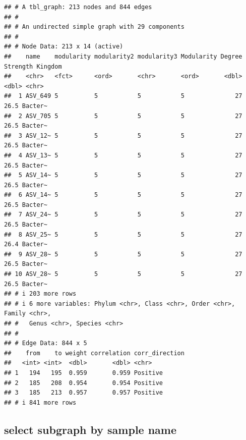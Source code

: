 \documentclass[
]{book}
\begin{document}
\begin{verbatim}
## # A tbl_graph: 213 nodes and 844 edges
## #
## # An undirected simple graph with 29 components
## #
## # Node Data: 213 x 14 (active)
##    name    modularity modularity2 modularity3 Modularity Degree Strength Kingdom
##    <chr>   <fct>      <ord>       <chr>       <ord>       <dbl>    <dbl> <chr>  
##  1 ASV_649 5          5           5           5              27     26.5 Bacter~
##  2 ASV_705 5          5           5           5              27     26.5 Bacter~
##  3 ASV_12~ 5          5           5           5              27     26.5 Bacter~
##  4 ASV_13~ 5          5           5           5              27     26.5 Bacter~
##  5 ASV_14~ 5          5           5           5              27     26.5 Bacter~
##  6 ASV_14~ 5          5           5           5              27     26.5 Bacter~
##  7 ASV_24~ 5          5           5           5              27     26.5 Bacter~
##  8 ASV_25~ 5          5           5           5              27     26.4 Bacter~
##  9 ASV_28~ 5          5           5           5              27     26.5 Bacter~
## 10 ASV_28~ 5          5           5           5              27     26.5 Bacter~
## # i 203 more rows
## # i 6 more variables: Phylum <chr>, Class <chr>, Order <chr>, Family <chr>,
## #   Genus <chr>, Species <chr>
## #
## # Edge Data: 844 x 5
##    from    to weight correlation corr_direction
##   <int> <int>  <dbl>       <dbl> <chr>         
## 1   194   195  0.959       0.959 Positive      
## 2   185   208  0.954       0.954 Positive      
## 3   185   213  0.957       0.957 Positive      
## # i 841 more rows
\end{verbatim}

\subsection{select subgraph by sample name}\label{select-subgraph-by-sample-name}
\end{document}
